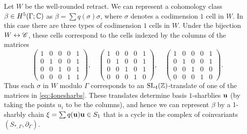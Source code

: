 Let $W$ be the well-rounded retract.  We can represent
a cohomology class $\beta \in H^{5} (\Gamma ; \mathbb{C})$ as $ \beta = \sum q
(\sigma )\sigma $, where $\sigma $ denotes a codimension $1$ cell in
$W$.  In this case there are three types of codimension $1$ cells in
$W$.  Under the bijection $W \leftrightarrow \mathscr C$, these cells
correspond to the \Vor cells indexed by the columns of the matrices 
\begin{equation}\label{eq:4onesharbs}
\left(\begin{array}{ccccc}
1&0&0&0&1\\
0&1&0&0&1\\
0&0&1&0&1\\
0&0&0&1&1
\end{array} \right),\quad 
\left(\begin{array}{ccccc}
1&0&0&0&1\\
0&1&0&0&1\\
0&0&1&0&1\\
0&0&0&1&0
\end{array} \right),\quad 
\left(\begin{array}{ccccc}
1&0&0&0&1\\
0&1&0&0&1\\
0&0&1&0&0\\
0&0&0&1&0
\end{array} \right).
\end{equation}
Thus each $\sigma$ in $W$ modulo $\Gamma$ corresponds to an $\operatorname{SL}_{4}
(\mathbb{Z})$-translate of one of the matrices in \eqref{eq:4onesharbs}.  
These translates
determine basis $1$-sharblies ${\mathbf {u}}$ (by taking the points $u_{i}$ to
be the columns), and hence we can represent $\beta$ by a 1-sharbly
chain $ \xi = \sum q
({\mathbf {u}}) {\mathbf {u}} \in S_{1}$ that is a cycle in the complex of coinvariants
$(S_{*,\Gamma}, \partial_{\Gamma})$.

